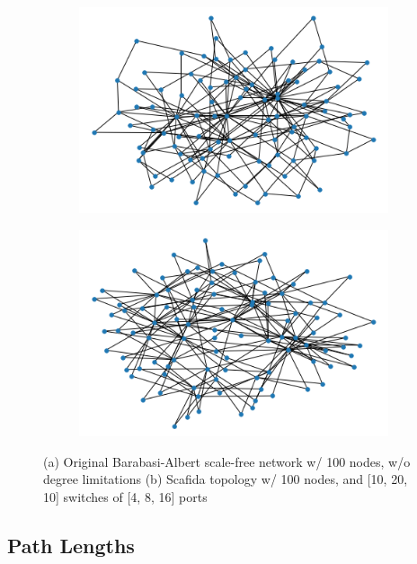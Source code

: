 \begin{figure}[h!]
\begin{subfigure}[b]{0.5\textwidth}
  \centering
   \includegraphics[width=0.9\linewidth]{figures/barabasi}
   \caption{}
   \label{fig:Ng1} 
\end{subfigure}

\begin{subfigure}[b]{0.5\textwidth}
  \centering
   \includegraphics[width=0.9\linewidth]{figures/scafida}
   \caption{}
   \label{fig:Ng2}
\end{subfigure}

\caption{(a) Original Barabasi-Albert scale-free network w/ 100 nodes, w/o degree limitations
(b) Scafida topology w/ 100 nodes, and [10, 20, 10] switches of [4, 8, 16] ports}
\end{figure}

\subsection{Path Lengths}

